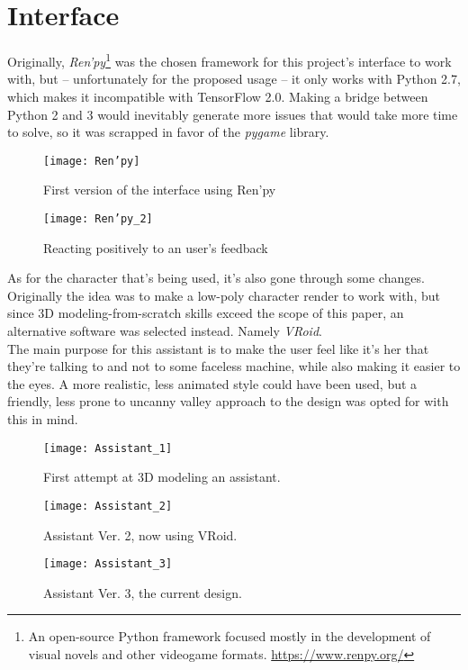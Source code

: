 \section{Interface}
Originally, \textit{Ren'py}\footnote{An open-source Python framework focused mostly in the development of visual novels and other videogame formats. \url{https://www.renpy.org/}} was the chosen framework for this project's interface to work with, but -- unfortunately for the proposed usage -- it only works with Python 2.7, which makes it incompatible with TensorFlow 2.0. Making a bridge between Python 2 and 3 would inevitably generate more issues that would take more time to solve, so it was scrapped in favor of the \textit{pygame} library.
\pagebreak

\begin{figure}[!h]
	\centering
	\texttt{[image: Ren'py]}
	\caption{First version of the interface using Ren'py}
	\label{fig:renpy_test_1}
\end{figure}
\begin{figure}[!h]
	\centering
	\texttt{[image: Ren'py\_2]}
	\caption{Reacting positively to an user's feedback}
	\label{fig:renpy_test_2}
\end{figure}

\pagebreak
As for the character that's being used, it's also gone through some changes. Originally the idea was to make a low-poly character render to work with, but since 3D modeling-from-scratch skills exceed the scope of this paper, an alternative software was selected instead. Namely \textit{VRoid}.\\
The main purpose for this assistant is to make the user feel like it's her that they're talking to and not to some faceless machine, while also making it easier to the eyes. A more realistic, less animated style could have been used, but a friendly, less prone to uncanny valley approach to the design was opted for with this in mind.
\begin{figure}[!ht]
	\centering
	\texttt{[image: Assistant\_1]}
	\caption{First attempt at 3D modeling an assistant.}
	\label{fig:assistant1}
\end{figure}
\begin{figure}[!ht]
	\centering
	\texttt{[image: Assistant\_2]}
	\caption{Assistant Ver. 2, now using VRoid.}
	\label{fig:assistant2}
\end{figure}
\begin{figure}[!ht]
	\centering
	\texttt{[image: Assistant\_3]}
	\caption{Assistant Ver. 3, the current design.}
	\label{fig:assistant3}
\end{figure}


